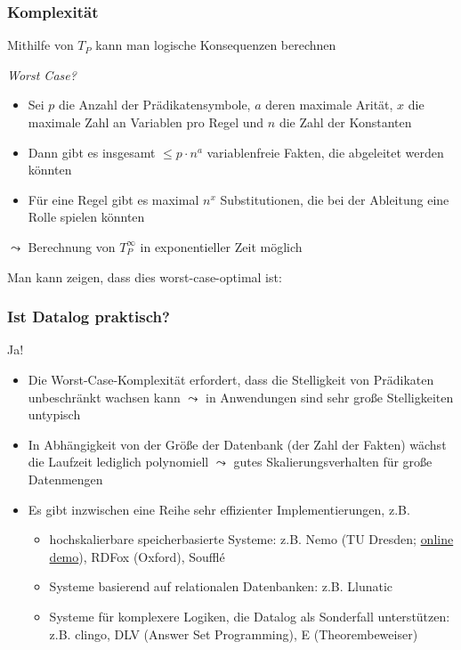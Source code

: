 \documentclass[aspectratio=1610,onlymath]{beamer}
\let\beameroriginaldoublebackslash\\
\let\\=\beameroriginaldoublebackslash
\begin{document}
\begin{frame}\frametitle{Komplexität}

Mithilfe von $T_P$ kann man logische Konsequenzen berechnen\\
\bigskip\pause

\emph{Worst Case?}
\begin{itemize}
\item Sei $p$ die Anzahl der Prädikatensymbole, $a$ deren maximale Arität, $x$ die maximale Zahl an Variablen pro Regel und $n$ die Zahl der Konstanten
\item Dann gibt es insgesamt $\leq p\cdot n^a$ variablenfreie Fakten, die abgeleitet werden könnten
\item Für eine Regel gibt es maximal $n^x$ Substitutionen, die bei der Ableitung eine Rolle spielen könnten
\end{itemize}\pause
$\leadsto$ Berechnung von $T_P^\infty$ in exponentieller Zeit möglich
\bigskip\pause

Man kann zeigen, dass dies worst-case-optimal ist:\medskip


\end{frame}

\begin{frame}\frametitle{Ist Datalog praktisch?}

\pause\bigskip

\alert{Ja!}
\begin{itemize}
\item Die Worst-Case-Komplexität erfordert, dass die Stelligkeit von Prädikaten unbeschränkt wachsen kann $\leadsto$ in Anwendungen sind sehr große Stelligkeiten untypisch
\item In Abhängigkeit von der Größe der Datenbank (der Zahl der Fakten) wächst die Laufzeit lediglich polynomiell $\leadsto$ gutes Skalierungsverhalten für große Datenmengen
\item Es gibt inzwischen eine Reihe sehr effizienter Implementierungen, z.B.
\begin{itemize}
\item hochskalierbare speicherbasierte Systeme: z.B. Nemo (TU Dresden; \alert{\href{https://tools.iccl.inf.tu-dresden.de/nemo/}{online demo}}), RDFox (Oxford), Souffl\'{e}
\item Systeme basierend auf relationalen Datenbanken: z.B. Llunatic
\item Systeme für komplexere Logiken, die Datalog als Sonderfall unterstützen: z.B. clingo, DLV (Answer Set Programming), E (Theorembeweiser)
\end{itemize}
\end{itemize}

\end{frame}
\end{document}
